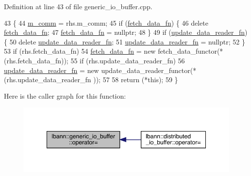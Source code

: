 Definition at line 43 of file generic\+\_\+io\+\_\+buffer.\+cpp.


\begin{DoxyCode}
43                                                                             \{
44   \hyperlink{classlbann_1_1generic__io__buffer_a2e4a46c85c8b30e10b1cc5acaa2c4cca}{m\_comm} = rhs.m\_comm;
45   \textcolor{keywordflow}{if} (\hyperlink{classlbann_1_1generic__io__buffer_a267170b4fd11dc60c782a9cb2b7b06cc}{fetch\_data\_fn}) \{
46     \textcolor{keyword}{delete} \hyperlink{classlbann_1_1generic__io__buffer_a267170b4fd11dc60c782a9cb2b7b06cc}{fetch\_data\_fn};
47     \hyperlink{classlbann_1_1generic__io__buffer_a267170b4fd11dc60c782a9cb2b7b06cc}{fetch\_data\_fn} = \textcolor{keyword}{nullptr};
48   \}
49   \textcolor{keywordflow}{if} (\hyperlink{classlbann_1_1generic__io__buffer_a031eda7559a9e241afb3958b56088560}{update\_data\_reader\_fn}) \{
50     \textcolor{keyword}{delete} \hyperlink{classlbann_1_1generic__io__buffer_a031eda7559a9e241afb3958b56088560}{update\_data\_reader\_fn};
51     \hyperlink{classlbann_1_1generic__io__buffer_a031eda7559a9e241afb3958b56088560}{update\_data\_reader\_fn} = \textcolor{keyword}{nullptr};
52   \}
53   \textcolor{keywordflow}{if} (rhs.fetch\_data\_fn)
54     \hyperlink{classlbann_1_1generic__io__buffer_a267170b4fd11dc60c782a9cb2b7b06cc}{fetch\_data\_fn} = \textcolor{keyword}{new} fetch\_data\_functor(*(rhs.fetch\_data\_fn));
55   \textcolor{keywordflow}{if} (rhs.update\_data\_reader\_fn)
56     \hyperlink{classlbann_1_1generic__io__buffer_a031eda7559a9e241afb3958b56088560}{update\_data\_reader\_fn} = \textcolor{keyword}{new} update\_data\_reader\_functor(*(rhs.update\_data\_reader\_fn
      ));
57 
58   \textcolor{keywordflow}{return} (*\textcolor{keyword}{this});
59 \}
\end{DoxyCode}
Here is the caller graph for this function\+:\nopagebreak
\begin{figure}[H]
\begin{center}
\leavevmode
\includegraphics[width=348pt]{classlbann_1_1generic__io__buffer_ae8d2b80e11cf780def151a425a6b1fa0_icgraph}
\end{center}
\end{figure}
\mbox{\label{classlbann_1_1generic__io__buffer_af84c26ab5ee77d1d9ed9ea5d62823815}} 
